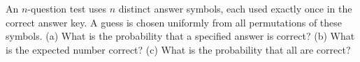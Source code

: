 An $n$-question test uses $n$ distinct answer symbols, each used exactly once in the correct answer key. A guess is chosen uniformly from all permutations of these symbols. (a) What is the probability that a specified answer is correct? (b) What is the expected number correct? (c) What is the probability that all are correct?
